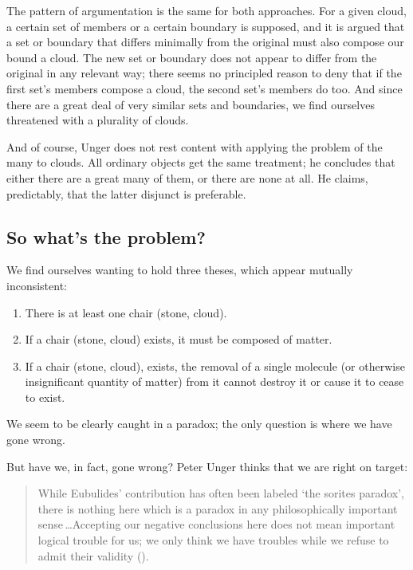 \documentclass[11pt]{article}
\newenvironment{squote}{%
	\begin{quote}\begin{singlespace}%
	}{%
	\end{singlespace}\end{quote}}
\begin{document}
\begin{spacing}{1.5}
The pattern of argumentation is the same for both approaches.  For a
given cloud, a certain set of members or a certain boundary is
supposed, and it is argued that a set or boundary that differs
minimally from the original must also compose our bound a cloud.  The
new set or boundary does not appear to differ from the original in any
relevant way; there seems no principled reason to deny that if the
first set's members compose a cloud, the second set's members do too.
And since there are a great deal of very similar sets and boundaries,
we find ourselves threatened with a plurality of clouds.

And of course, Unger does not rest content with applying the problem
of the many to clouds.  All ordinary objects get the same treatment;
he concludes that either there are a great many of them, or there are
none at all.  He claims, predictably, that the latter disjunct is
preferable.

\subsection{So what's the problem?}
We find ourselves wanting to hold three theses, which appear mutually
inconsistent:

\begin{enumerate}
  \item There is at least one chair (stone, cloud).
  \item If a chair (stone, cloud) exists, it must be composed of
    matter.
  \item If a chair (stone, cloud), exists, the removal of a single
    molecule (or otherwise insignificant quantity of matter) from it
    cannot destroy it or cause it to cease to exist.
\end{enumerate}

We seem to be clearly caught in a paradox; the only question is where
we have gone wrong.

But have we, in fact, gone wrong?  Peter Unger thinks that we are
right on target:

\begin{squote}
While Eubulides' contribution has often been labeled `the sorites
paradox', there is nothing here which is a paradox in any
philosophically important sense\,\ldots Accepting our negative
conclusions here does not mean important logical trouble for us; we
only think we have troubles while we refuse to admit their validity
(\citeyear[145]{unger1979}).
\end{squote}


\end{spacing}
\end{document}
